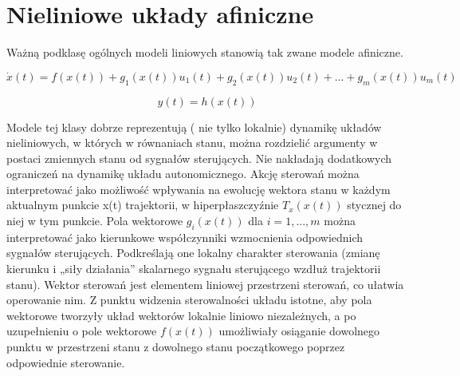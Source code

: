 \documentclass{article}
\begin{document}
		\section{Nieliniowe układy afiniczne}

		Ważną podklasę ogólnych modeli liniowych stanowią tak zwane modele afiniczne.

		\begin{equation}
			\dot{x}(t) = f(x(t)) + g_1(x(t))u_1(t) + g_2(x(t))u_2(t) + ...
			+ g_m(x(t))u_m(t) 
		\end{equation}

		\begin{equation}
			y(t) = h(x(t))
		\end{equation}

		Modele tej klasy dobrze reprezentują ( nie tylko lokalnie) dynamikę 
		układów nieliniowych, w których w równaniach stanu, można rozdzielić argumenty
		w postaci zmiennych stanu od sygnałów sterujących. Nie nakładają dodatkowych 
		ograniczeń na dynamikę układu autonomicznego. Akcję sterowań można interpretować
		jako możliwość wpływania na ewolucję wektora stanu w każdym aktualnym punkcie x(t)
		trajektorii, w hiperpłaszczyźnie $T_x(x(t))$ stycznej do niej w tym punkcie.
		Pola wektorowe $g_i(x(t))$  dla $i= 1, ... , m$ można
		interpretować jako kierunkowe współczynniki wzmocnienia odpowiednich sygnałów
		sterujących. Podkreślają one lokalny charakter sterowania (zmianę kierunku i „siły działania”
		skalarnego sygnału sterującego wzdłuż trajektorii stanu). Wektor sterowań jest elementem
		liniowej przestrzeni sterowań, co ułatwia operowanie nim. Z punktu widzenia sterowalności
		układu istotne, aby pola wektorowe tworzyły układ wektorów lokalnie liniowo niezależnych,
		a po uzupełnieniu o pole wektorowe $f(x(t))$
		umożliwiały osiąganie dowolnego punktu w
		przestrzeni stanu z dowolnego stanu początkowego poprzez odpowiednie sterowanie.
\end{document}

